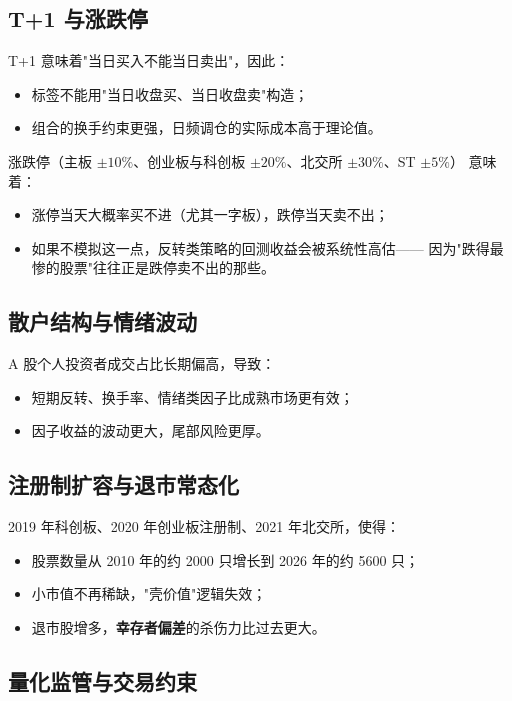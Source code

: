\subsection{T+1 与涨跌停}

T+1 意味着"当日买入不能当日卖出"，因此：
\begin{itemize}
  \item 标签不能用"当日收盘买、当日收盘卖"构造；
  \item 组合的换手约束更强，日频调仓的实际成本高于理论值。
\end{itemize}

涨跌停（主板 $\pm10\%$、创业板与科创板 $\pm20\%$、北交所 $\pm30\%$、ST $\pm5\%$）
意味着：
\begin{itemize}
  \item 涨停当天大概率买不进（尤其一字板），跌停当天卖不出；
  \item 如果不模拟这一点，反转类策略的回测收益会被系统性高估——
        因为"跌得最惨的股票"往往正是跌停卖不出的那些。
\end{itemize}

\subsection{散户结构与情绪波动}

A 股个人投资者成交占比长期偏高，导致：
\begin{itemize}
  \item 短期反转、换手率、情绪类因子比成熟市场更有效；
  \item 因子收益的波动更大，尾部风险更厚。
\end{itemize}

\subsection{注册制扩容与退市常态化}

2019 年科创板、2020 年创业板注册制、2021 年北交所，使得：
\begin{itemize}
  \item 股票数量从 2010 年的约 2000 只增长到 2026 年的约 5600 只；
  \item 小市值不再稀缺，"壳价值"逻辑失效；
  \item 退市股增多，\textbf{幸存者偏差}的杀伤力比过去更大。
\end{itemize}

\subsection{量化监管与交易约束}

